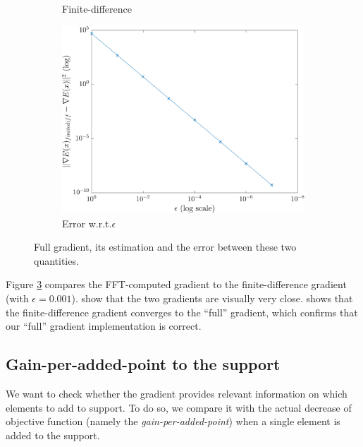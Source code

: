 \begin{figure}[!ht]
\begin{subfigure}[b]{0.30\textwidth}
\caption{Finite-difference}\label{fig_verif_gradient-finite}
\end{subfigure}
\begin{subfigure}[b]{0.35\textwidth}\centering
\includegraphics[width=\textwidth]{figures/verif_gradient/finite-diff-vs-grad.pdf}
\caption{Error w.r.t.\@ $\epsilon$}\label{fig_verif_gradient-error}
\end{subfigure}
\caption{Full gradient, its estimation and the error between these two quantities.}\label{fig_verif_gradient}
\end{figure}

\noindent
Figure \ref{fig_verif_gradient} compares the FFT-computed gradient to the finite-difference gradient (with $\epsilon=0.001$).  show that the two gradients are visually very close.  shows that the finite-difference gradient converges to the “full” gradient, which confirms that our “full” gradient implementation is correct.


\subsection{Gain-per-added-point to the support}\label{sec_gain_per_added_point}

We want to check whether the gradient provides relevant information on which elements to add to support. To do so, we compare it with the actual decrease of objective function (namely the \emph{gain-per-added-point}) when a single element is added to the support.

